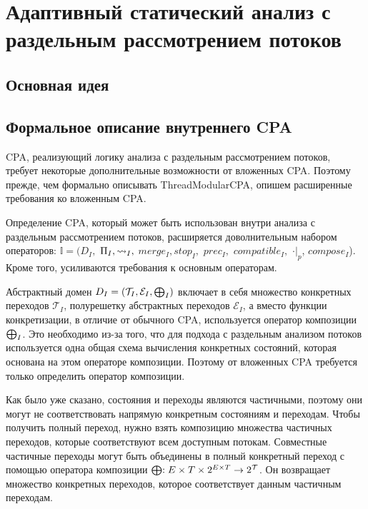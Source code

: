 \newcommand{\IR}{IR}
\newcommand{\conctm}[1]{\conc{#1}_{TM}}

\section{Адаптивный статический анализ с раздельным рассмотрением потоков}
\label{sect_tm_cpa}

\subsection{Основная идея}

\subsection{Формальное описание внутреннего CPA}
 
CPA, реализующий логику анализа с раздельным рассмотрением потоков, требует некоторые дополнительные возможности от вложенных CPA. 
Поэтому прежде, чем формально описывать ThreadModularCPA, опишем расширенные требования ко вложенным CPA.
 
Определение CPA, который может быть использован внутри анализа с раздельным рассмотрением потоков, расширяется доволнительным набором операторов: $\mathbb{I}=(D_{I},$ $\Pi_{I}, \leadsto_{I},$ $merge_{I}, stop_{I},$ $prec_{I},$ $compatible_{I},$ $\cdot|_p$, $compose_I$).
Кроме того, усиливаются требования к основным операторам.

Абстрактный домен $D_I = (\mathcal{T}_I, \mathcal{E}_I, \mathrel{\bigoplus}_I)$ включает в себя множество конкретных переходов $\mathcal{T}_I$, полурешетку абстрактных переходов $\mathcal{E}_I$, а вместо функции конкретизации, в отличие от обычного CPA, используется оператор композиции $\mathrel{\bigoplus}_I$.
Это необходимо из-за того, что для подхода с раздельным анализом потоков используется одна общая схема вычисления конкретных состояний, которая основана на этом операторе композиции. 
Поэтому от вложенных CPA требуется только определить оператор композиции.

Как было уже сказано, состояния и переходы являются частичными, поэтому они могут не соответствовать напрямую конкретным состояниям и переходам. Чтобы получить полный переход, нужно взять композицию множества частичных переходов, которые соответствуют всем доступным потокам. Совместные частичные переходы могут быть объединены в полный конкретный переход с помощью оператора композиции $\mathrel{\bigoplus}: E \times T \times 2^{E \times T} \to 2^{\mathcal{T}}$.
Он возвращает множество конкретных переходов, которое соответствует данным частичным переходам.

